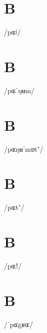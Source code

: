 \documentclass[10pt,a4paper,twoside]{book}
\begin{document}
\section*{B}

\begin{multicols}{3}
 {/pɶǀ/} {}
\end{multicols}

\section*{B}

\begin{multicols}{3}
 {/pɶˈŋʉm/} {}
\end{multicols}

\section*{B}

\begin{multicols}{3}
 {/pɶŋʉˈmɒtʼ/} {}
\end{multicols}

\section*{B}

\begin{multicols}{3}
 {/pɶtʼ/} {}
\end{multicols}

\section*{B}

\begin{multicols}{3}
 {/pɶǃ/} {}
\end{multicols}

\section*{B}

\begin{multicols}{3}
 {/ˈpɶgʁɶ/} {}
\end{multicols}
\end{document}
